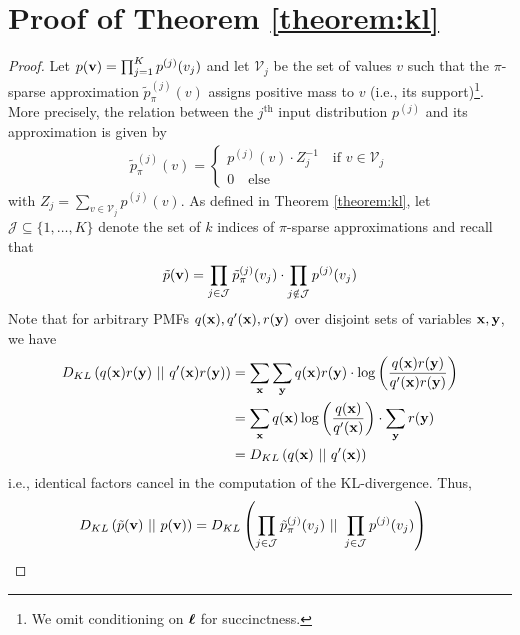 \section{Proof of Theorem \ref{theorem:kl}}
\label{app:kl_proof}
\begin{proof}
Let $p(\mathbf{v}) = \prod_{j=1}^K p^{(j)}(v_j)$ and let $\mathcal{V}_j$ be the set of values $v$ such that the $\pi$-sparse approximation $\tilde{p}_\pi^{(j)}(v)$ assigns positive mass to $v$ (i.e., its support)\footnote{We omit conditioning on $\boldsymbol{\ell}$ for succinctness.}. More precisely, the relation between the $j^{\text{th}}$ input distribution $p^{(j)}$ and its approximation is given by
\begin{align}
\tilde{p}_\pi^{(j)}(v) = 
\begin{cases}
    p^{(j)}(v) \cdot Z_j^{-1} \quad \text{if } v \in \mathcal{V}_j \\
    0 \quad \text{else}
\end{cases}
\end{align}
with $Z_j = \sum_{v \in \mathcal{V}_j} p^{(j)}(v)$.
As defined in Theorem \ref{theorem:kl}, let $\mathcal{J} \subseteq \{1,\dots,K\}$ denote the set of $k$ indices of $\pi$-sparse approximations and recall that
\begin{align}
    \tilde{p}(\mathbf{v}) = \prod_{j \in \mathcal{J}} \tilde{p}^{(j)}_\pi(v_j) \cdot \prod_{j \notin \mathcal{J}} p^{(j)}(v_j)
\end{align}
Note that for arbitrary PMFs $q(\mathbf{x}), q'(\mathbf{x}), r(\mathbf{y})$ over disjoint sets of variables $\mathbf{x}, \mathbf{y}$, we have
\begin{align}
    D_{KL}\left( q(\mathbf{x}) r(\mathbf{y}) \ || \ q'(\mathbf{x}) r(\mathbf{y}) \right) &= \sum_{\mathbf{x}} \sum_{\mathbf{y}} q(\mathbf{x}) r(\mathbf{y}) \cdot \log \left( \frac{q(\mathbf{x}) r(\mathbf{y})}{q'(\mathbf{x}) r(\mathbf{y})} \right) \\
    &= \sum_{\mathbf{x}} q(\mathbf{x}) \log \left( \frac{q(\mathbf{x})}{q'(\mathbf{x})} \right) \cdot \sum_{\mathbf{y}} r(\mathbf{y}) \\
    &= D_{KL}\left( q(\mathbf{x}) \ || \ q'(\mathbf{x}) \right)
\end{align}
i.e., identical factors cancel in the computation of the KL-divergence. Thus,
\begin{align}
    D_{KL}\left( \tilde{p}(\vv) \ || \ p(\vv) \right) &= D_{KL}\left( \prod_{j \in \mathcal{J}} \tilde{p}^{(j)}_\pi(v_j) \ || \ \prod_{j \in \mathcal{J}} p^{(j)}(v_j) \right)
\end{align}


\end{proof}
